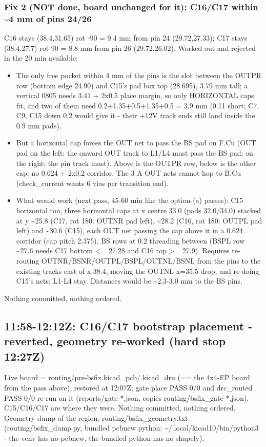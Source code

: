 \documentclass[11pt]{article}
\begin{document}
\subsubsection*{Fix 2 (NOT done, board unchanged for it): C16/C17 within \textasciitilde{}4 mm of pins 24/26}
C16 stays (38.4,31.65) rot -90 = 9.4 mm from pin 24 (29.72,27.33); C17 stays (38.4,27.7) rot 90 = 8.8 mm from pin 26 (29.72,26.02). Worked out and rejected in the 20 min available:

\begin{itemize}
\item The only free pocket within 4 mm of the pins is the slot between the OUTPR row (bottom edge 24.90)
and C15's pad box top (28.695), 3.79 mm tall; a vertical 0805 needs 3.41 + 2x0.5 place margin, so
only HORIZONTAL caps fit, and two of them need 0.2+1.35+0.5+1.35+0.5 = 3.9 mm (0.11 short; C7, C9,
C15 down 0.2 would give it - their +12V track ends still land inside the 0.9 mm pads).
\item But a horizontal cap forces the OUT net to pass the BS pad on F.Cu (OUT pad on the left: the
onward OUT track to L1/L4 must pass the BS pad; on the right: the pin track must). Above is the
OUTPR row, below is the other cap: no 0.624 + 2x0.2 corridor. The 3 A OUT nets cannot hop to B.Cu
(check\_current wants 6 vias per transition end).
\item What would work (next pass, 45-60 min like the option-(a) passes): C15 horizontal too, three
horizontal caps at x centre 33.0 (pads 32.0/34.0) stacked at y \textasciitilde{}25.8 (C17, rot 180: OUTNR pad left),
\textasciitilde{}28.2 (C16, rot 180: OUTPL pad left) and \textasciitilde{}30.6 (C15), each OUT net passing the cap above it in a
0.624 corridor (cap pitch 2.375), BS rows at 0.2 threading between (BSPL row \textasciitilde{}27.6 needs C17 bottom
\textless{}= 27.28 and C16 top \textgreater{}= 27.9). Requires re-routing OUTNR/BSNR/OUTPL/BSPL/OUTNL/BSNL from the
pins to the existing tracks east of x 38.4, moving the OUTNL x=35.5 drop, and re-doing C15's nets;
L1-L4 stay. Distances would be \textasciitilde{}2.3-3.0 mm to the BS pins.
\end{itemize}
Nothing committed, nothing ordered.

\subsection*{11:58-12:12Z: C16/C17 bootstrap placement - reverted, geometry re-worked (hard stop 12:27Z)}
Live board = routing/pre-bsfix.kicad\_pcb/.kicad\_dru (== the 4x4-EP board from the pass above), restored at 12:07Z; gate place PASS 0/0 and drc\_routed PASS 0/0 re-run on it (reports/gate-{*}.json, copies routing/bsfix\_gate-{*}.json). C15/C16/C17 are where they were. Nothing committed, nothing ordered. Geometry dump of the region: routing/bsfix\_geometry.txt (routing/bsfix\_dump.py, bundled pcbnew python: \textasciitilde{}/.local/kicad10/bin/python3 - the venv has no pcbnew, the bundled python has no shapely).
\end{document}
